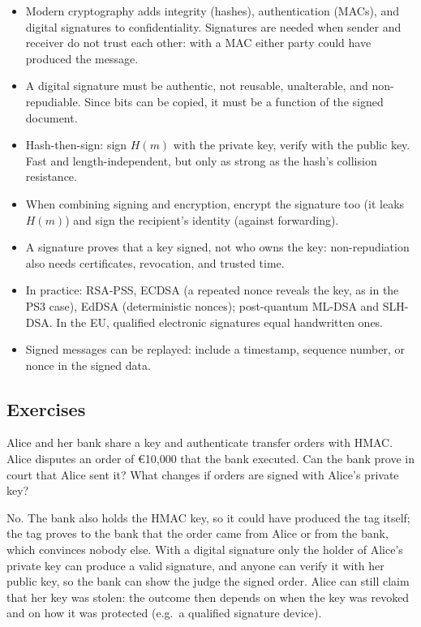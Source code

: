 \begin{summary}
\begin{itemize}
    \item Modern cryptography adds integrity (hashes), authentication (MACs), and digital signatures to confidentiality. Signatures are needed when sender and receiver do not trust each other: with a MAC either party could have produced the message.
    \item A digital signature must be authentic, not reusable, unalterable, and non-repudiable. Since bits can be copied, it must be a function of the signed document.
    \item Hash-then-sign: sign $H(m)$ with the private key, verify with the public key. Fast and length-independent, but only as strong as the hash's collision resistance.
    \item When combining signing and encryption, encrypt the signature too (it leaks $H(m)$) and sign the recipient's identity (against forwarding).
    \item A signature proves that a key signed, not who owns the key: non-repudiation also needs certificates, revocation, and trusted time.
    \item In practice: RSA-PSS, ECDSA (a repeated nonce reveals the key, as in the PS3 case), EdDSA (deterministic nonces); post-quantum ML-DSA and SLH-DSA. In the EU, qualified electronic signatures equal handwritten ones.
    \item Signed messages can be replayed: include a timestamp, sequence number, or nonce in the signed data.
\end{itemize}
\end{summary}

\subsection*{Exercises}

\begin{exercise}
Alice and her bank share a key and authenticate transfer orders with HMAC. Alice disputes an order of €10{,}000 that the bank executed. Can the bank prove in court that Alice sent it? What changes if orders are signed with Alice's private key?
\end{exercise}
\begin{solution}
No. The bank also holds the HMAC key, so it could have produced the tag itself; the tag proves to the bank that the order came from Alice or from the bank, which convinces nobody else. With a digital signature only the holder of Alice's private key can produce a valid signature, and anyone can verify it with her public key, so the bank can show the judge the signed order. Alice can still claim that her key was stolen: the outcome then depends on when the key was revoked and on how it was protected (e.g.\ a qualified signature device).
\end{solution}

